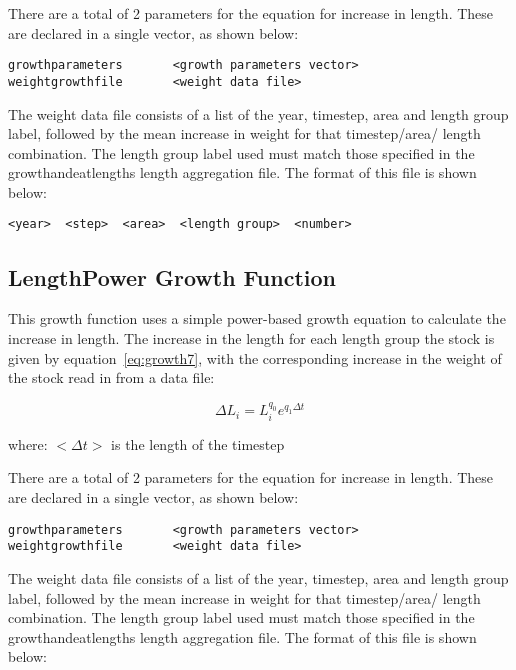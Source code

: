 \documentclass [a4paper, 10pt]{book}
\begin{document}
\bigskip
There are a total of 2 parameters for the equation for increase in length.  These are declared in a single vector, as shown below:

{\small\begin{verbatim}
growthparameters       <growth parameters vector>
weightgrowthfile       <weight data file>
\end{verbatim}}

The weight data file consists of a list of the year, timestep, area  and length group label, followed by the mean increase in weight for that timestep/area/ length combination.  The length group label used must match those specified in the growthandeatlengths length aggregation file.  The format of this file is shown below:

{\small\begin{verbatim}
<year>  <step>  <area>  <length group>  <number>
\end{verbatim}}

\subsection{LengthPower Growth Function}\label{subsec:growth7}
This growth function uses a simple power-based growth equation to calculate the increase in length.  The increase in the length for each length group the stock is given by equation~\ref{eq:growth7}, with the corresponding increase in the weight of the stock read in from a data file:

\begin{equation}\label{eq:growth7}
\Delta L_{i} = L_{i}^{q_{0}} e^{q_{1} \Delta t}
\end{equation}

where:\newline
$<\Delta t>$ is the length of the timestep

\bigskip
There are a total of 2 parameters for the equation for increase in length.  These are declared in a single vector, as shown below:

{\small\begin{verbatim}
growthparameters       <growth parameters vector>
weightgrowthfile       <weight data file>
\end{verbatim}}

The weight data file consists of a list of the year, timestep, area  and length group label, followed by the mean increase in weight for that timestep/area/ length combination.  The length group label used must match those specified in the growthandeatlengths length aggregation file.  The format of this file is shown below:
\end{document}
